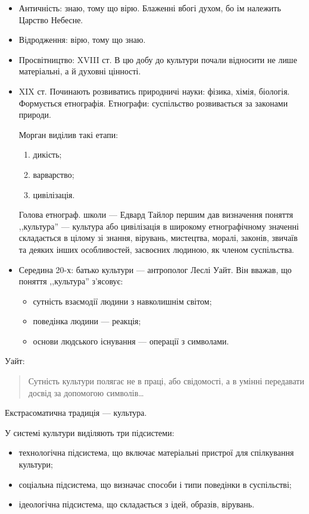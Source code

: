 \documentclass[a5paper,10pt,titlepage,pdftex,headsepline]{scrartcl}
\begin{document}
\begin{itemize}
\item Античність: знаю, тому що вірю. Блаженні вбогі духом, бо ім належить Царство Небесне.
\item Відродження: вірю, тому що знаю.
\item Просвітництво: XVIII ст. В цю добу до культури почали відносити не лише матеріальні, а й духовні цінності.
\item XIX ст. Починають розвиватись природничі науки: фізика, хімія, біологія.
  Формується етнографія.
  Етнографи: суспільство розвивається за законами природи.

Морган виділив такі етапи:
\begin{enumerate}
\item дикість;
\item варварство;
\item цивілізація.
\end{enumerate}

Голова етнограф. школи --- Едвард Тайлор першим дав визначення поняття ,,культура'' --- культура або цивілізація в широкому етнографічному значенні складається в цілому зі знання, вірувань, мистецтва, моралі, законів, звичаїв та деяких інших особливостей, засвоєних людиною, як членом суспільства.

\item Середина 20-х: батько культури --- антрополог Леслі Уайт.
  Він вважав, що поняття ,,культура'' з'ясовує:
\begin{itemize}
\item сутність взаємодії людини з навколишнім світом;
\item поведінка людини --- реакція;
\item основи людського існування --- операції з символами.
\end{itemize}
\end{itemize}

Уайт:
\begin{quote}
  Сутність культури полягає не в праці, або свідомості, а в умінні передавати досвід за допомогою символів\dots
\end{quote}

Екстрасоматична традиція --- культура.

У системі культури виділяють три підсистеми:
\begin{itemize}
\item технологічна підсистема, що включає матеріальні пристрої для спілкування культури;
\item соціальна підсистема, що визначає способи і типи поведінки в суспільстві;
\item ідеологічна підсистема, що складається з ідей, образів, вірувань.
\end{itemize}
\end{document}
